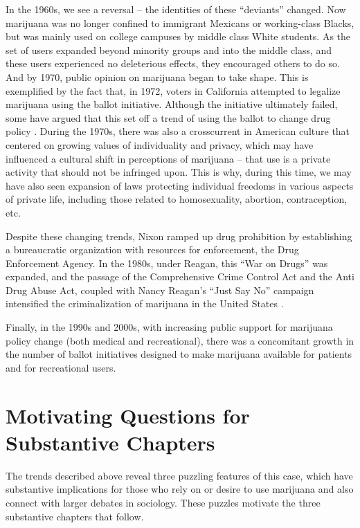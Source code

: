 In the 1960s, we see a reversal -- the identities of these ``deviants'' changed. Now marijuana was no longer confined to immigrant Mexicans or working-class Blacks, but was mainly used on college campuses by middle class White students. As the set of users expanded beyond minority groups and into the middle class, and these users experienced no deleterious effects, they encouraged others to do so. And by 1970, public opinion on marijuana began to take shape. This is exemplified by the fact that, in 1972, voters in California attempted to legalize marijuana using the ballot initiative. Although the initiative ultimately failed, some have argued that this set off a trend of using the ballot to change drug policy \citep{miron_2010,mosher_and_akins_2019,newhart_and_dolphin_2018}. During the 1970s, there was also a crosscurrent in American culture that centered on growing values of individuality and privacy, which may have influenced a cultural shift in perceptions of marijuana -- that use is a private activity that should not be infringed upon. This is why, during this time, we may have also seen expansion of laws protecting individual freedoms in various aspects of private life, including those related to homosexuality, abortion, contraception, etc. 

Despite these changing trends, Nixon ramped up drug prohibition by establishing a bureaucratic organization with resources for enforcement, the Drug Enforcement Agency. In the 1980s, under Reagan, this ``War on Drugs'' was expanded, and the passage of the Comprehensive Crime Control Act and the Anti Drug Abuse Act, coupled with Nancy Reagan's ``Just Say No'' campaign intensified the criminalization of marijuana in the United States \citep{mosher_and_akins_2019,caulkins_et_al_2012}.

Finally, in the 1990s and 2000s, with increasing public support for marijuana policy change (both medical and recreational), there was a concomitant growth in the number of ballot initiatives designed to make marijuana available for patients and for recreational users. 




\section{Motivating Questions for Substantive Chapters}

The trends described above reveal three puzzling features of this case, which have substantive implications for those who rely on or desire to use marijuana and also connect with larger debates in sociology. These puzzles motivate the three substantive chapters that follow. 

